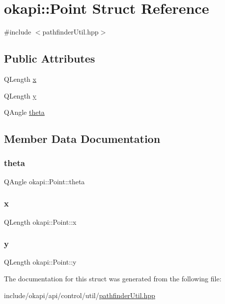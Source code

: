 \hypertarget{structokapi_1_1Point}{}\section{okapi\+::Point Struct Reference}
\label{structokapi_1_1Point}


{\ttfamily \#include $<$pathfinder\+Util.\+hpp$>$}

\subsection*{Public Attributes}
\begin{DoxyCompactItemize}
\item 
Q\+Length \mbox{\hyperlink{structokapi_1_1Point_a49a37b80b4c067214556e3da3532d2ac}{x}}
\item 
Q\+Length \mbox{\hyperlink{structokapi_1_1Point_a6acb599ade55d1df76ad805ac6bb174d}{y}}
\item 
Q\+Angle \mbox{\hyperlink{structokapi_1_1Point_aff79941175ee144b5d9cea628c00ebc8}{theta}}
\end{DoxyCompactItemize}


\subsection{Member Data Documentation}
\mbox{\label{structokapi_1_1Point_aff79941175ee144b5d9cea628c00ebc8}} 
\subsubsection{\texorpdfstring{theta}{theta}}
{\footnotesize\ttfamily Q\+Angle okapi\+::\+Point\+::theta}

\mbox{\label{structokapi_1_1Point_a49a37b80b4c067214556e3da3532d2ac}} 
\subsubsection{\texorpdfstring{x}{x}}
{\footnotesize\ttfamily Q\+Length okapi\+::\+Point\+::x}

\mbox{\label{structokapi_1_1Point_a6acb599ade55d1df76ad805ac6bb174d}} 
\subsubsection{\texorpdfstring{y}{y}}
{\footnotesize\ttfamily Q\+Length okapi\+::\+Point\+::y}



The documentation for this struct was generated from the following file\+:\begin{DoxyCompactItemize}
\item 
include/okapi/api/control/util/\mbox{\hyperlink{pathfinderUtil_8hpp}{pathfinder\+Util.\+hpp}}\end{DoxyCompactItemize}

